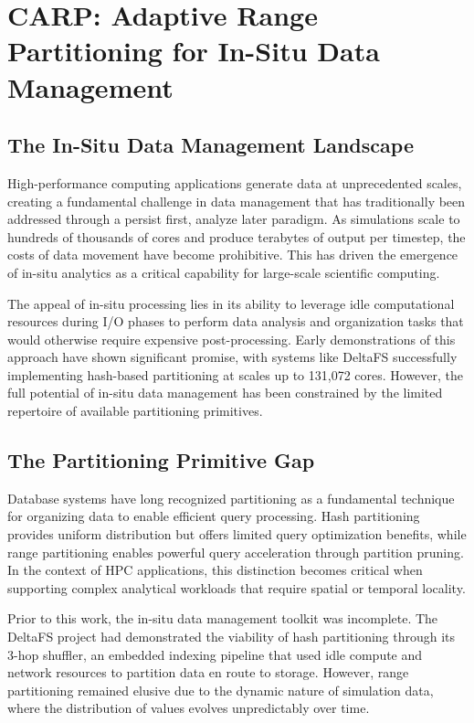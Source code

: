 \newpage
\chapter{CARP: Adaptive Range Partitioning for In-Situ Data Management}

\section{The In-Situ Data Management Landscape}

High-performance computing applications generate data at unprecedented scales, creating a
fundamental challenge in data management that has traditionally been addressed through a persist
first, analyze later paradigm.
As simulations scale to hundreds of thousands of cores and produce terabytes of output per
timestep, the costs of data movement have become prohibitive.
This has driven the emergence of in-situ analytics as a critical capability for large-scale
scientific computing.

The appeal of in-situ processing lies in its ability to leverage idle computational resources
during I/O phases to perform data analysis and organization tasks that would otherwise require
expensive post-processing.
Early demonstrations of this approach have shown significant promise, with systems like DeltaFS
successfully implementing hash-based partitioning at scales up to 131,072 cores.
However, the full potential of in-situ data management has been constrained by the limited
repertoire of available partitioning primitives.

\section{The Partitioning Primitive Gap}

Database systems have long recognized partitioning as a fundamental technique for organizing data
to enable efficient query processing.
Hash partitioning provides uniform distribution but offers limited query optimization benefits,
while range partitioning enables powerful query acceleration through partition pruning.
In the context of HPC applications, this distinction becomes critical when supporting complex
analytical workloads that require spatial or temporal locality.

Prior to this work, the in-situ data management toolkit was incomplete.
The DeltaFS project had demonstrated the viability of hash partitioning through its 3-hop shuffler,
an embedded indexing pipeline that used idle compute and network resources to partition data en
route to storage.
However, range partitioning remained elusive due to the dynamic nature of simulation data, where
the distribution of values evolves unpredictably over time.

